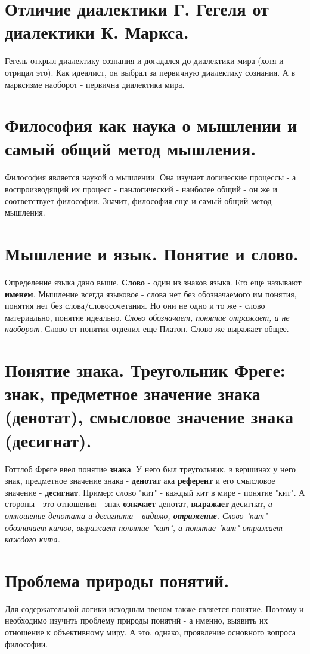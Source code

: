 \section{ Отличие диалектики Г. Гегеля от диалектики К. Маркса.}
Гегель открыл диалектику сознания и догадался до диалектики мира (хотя и отрицал это). Как идеалист, он выбрал за первичную диалектику сознания. А в марксизме наоборот - первична диалектика мира.

\section{ Философия как наука о мышлении и самый общий метод мышления.}
Философия является наукой о мышлении. Она изучает логические процессы - а воспроизводящий их процесс - панлогический - наиболее общий  - он же и соответствует философии. Значит, философия еще и самый общий метод мышления.

\section{ Мышление и язык. Понятие и слово.}
Определение языка дано выше. \textbf{Слово} - один из знаков языка. Его еще называют \textbf{именем}.  
Мышление всегда языковое - слова нет без обозначаемого им понятия, понятия нет без слова/словосочетания. Но они не одно и то же - слово материально, понятие идеально. \textit{Слово обозначает, понятие отражает, и не наоборот}. Слово от понятия отделил еще Платон.  Слово же выражает общее.

\section{ Понятие знака. Треугольник Фреге: знак, предметное значение знака (денотат), смысловое значение знака (десигнат).}
Готтлоб Фреге ввел понятие \textbf{знака}. У него был треугольник, в вершинах у него знак, предметное значение знака - \textbf{денотат} ака \textbf{референт} и его смысловое значение - \textbf{десигнат}. Пример: слово "кит" - каждый кит в мире - понятие "кит". А стороны - это отношения - знак \textbf{означает} денотат, \textbf{выражает} десигнат, \textit{а отношение денотата и десигната  - видимо, \textbf{отражение}. Слово "кит" обозначает китов, выражает понятие "кит", а понятие "кит" отражает каждого кита.}

\section{ Проблема природы понятий.}
Для содержательной логики исходным звеном также является понятие. Поэтому и необходимо изучить проблему природы понятий - а именно, выявить их отношение к объективному миру. А это, однако, проявление основного вопроса философии. 

